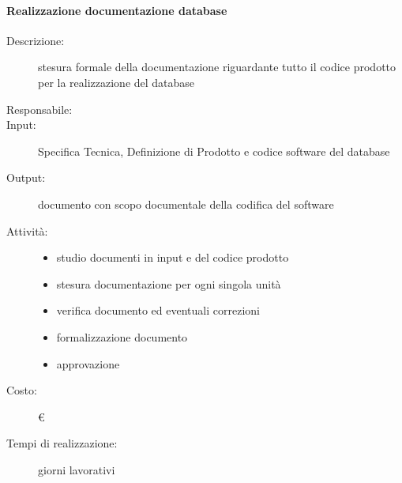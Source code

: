 \paragraph{Realizzazione documentazione database}
\begin{description}
\item[Descrizione:] stesura formale della documentazione riguardante tutto il codice prodotto
per la realizzazione del database 

\item[Responsabile:] 

\item[Input:] Specifica Tecnica, Definizione di Prodotto e codice software del database 

\item[Output:] documento con scopo documentale della codifica del software 

\item[Attività:]
\begin{itemize}
\item studio documenti in input e del codice prodotto
\item stesura documentazione per ogni singola unità
\item verifica documento ed eventuali correzioni
\item formalizzazione documento
\item approvazione
\end{itemize}
\item[Costo:] \euro 
\item[Tempi di realizzazione:]  giorni lavorativi
\end{description}



